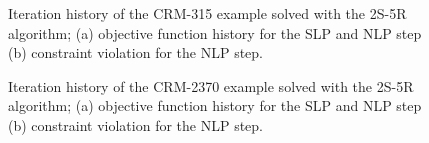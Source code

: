 \begin{figure}[]
    \hspace*{\fill}
    \hfill
    \hspace*{\fill}
    \caption{Iteration history of the CRM-315 example solved with the 2S-5R algorithm; (a) objective function history for the SLP and NLP step (b) constraint violation for the NLP step.}
    \label{fig:}
\end{figure}

\begin{figure}[]
    \hspace*{\fill}
    \hfill
    \hspace*{\fill}
    \caption{Iteration history of the CRM-2370 example solved with the 2S-5R algorithm; (a) objective function history for the SLP and NLP step (b) constraint violation for the NLP step.}
    \label{fig:}
\end{figure}
 